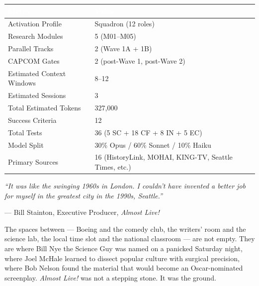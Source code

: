 \documentclass[11pt,letterpaper]{article}
\newcommand{\tableheader}[1]{\textbf{\sffamily\textcolor{white}{#1}}}
\begin{document}
\begin{center}
\begin{tabularx}{\textwidth}{L{5cm}X}
\toprule
{}
\tableheader{Metric} & \tableheader{Value} \\
\midrule
Activation Profile & Squadron (12 roles) \\
Research Modules & 5 (M01--M05) \\
Parallel Tracks & 2 (Wave 1A + 1B) \\
CAPCOM Gates & 2 (post-Wave 1, post-Wave 2) \\
Estimated Context Windows & 8--12 \\
Estimated Sessions & 3 \\
Total Estimated Tokens & 327,000 \\
Success Criteria & 12 \\
Total Tests & 36 (5 SC + 18 CF + 8 IN + 5 EC) \\
Model Split & 30\% Opus / 60\% Sonnet / 10\% Haiku \\
Primary Sources & 16 (HistoryLink, MOHAI, KING-TV, Seattle Times, etc.) \\
\bottomrule
\end{tabularx}
\end{center}

\vspace{2em}

\begin{quotebox}
\textit{``It was like the swinging 1960s in London. I couldn't have invented a better job for myself in the greatest city in the 1990s, Seattle.''}

\medskip
\hfill --- Bill Stainton, Executive Producer, \textit{Almost Live!}

\medskip
\noindent The spaces between --- Boeing and the comedy club, the writers' room and the science lab, the local time slot and the national classroom --- are not empty. They are where Bill Nye the Science Guy was named on a panicked Saturday night, where Joel McHale learned to dissect popular culture with surgical precision, where Bob Nelson found the material that would become an Oscar-nominated screenplay. \textit{Almost Live!} was not a stepping stone. It was the ground.
\end{quotebox}
\end{document}
